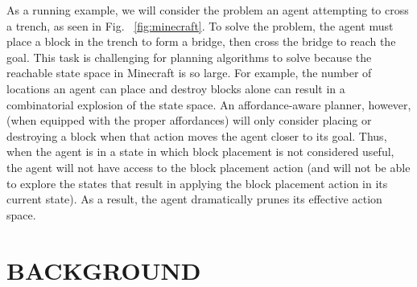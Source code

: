 \documentclass[]{article}
\begin{document}
As a running example, we will consider the problem an agent attempting to cross a trench, as seen in Fig. ~\ref{fig:minecraft}.
To solve the problem, the agent must place a block in the trench to
form a bridge, then cross the bridge to reach the goal.  This task is
challenging for planning algorithms to solve because the reachable
state space in Minecraft is so large. For example, the number of
locations an agent can place and destroy blocks alone can result in a
combinatorial explosion of the state space. An affordance-aware
planner, however, (when equipped with the proper affordances) will
only consider placing or destroying a block when that action moves
the agent closer to its goal. Thus, when the agent is in a state in
which block placement is not considered useful, the agent will not
have access to the block placement action (and will not be able to
explore the states that result in applying the block placement action
in its current state). As a result, the agent dramatically prunes its
effective action space.





\section{BACKGROUND}

\end{document}
